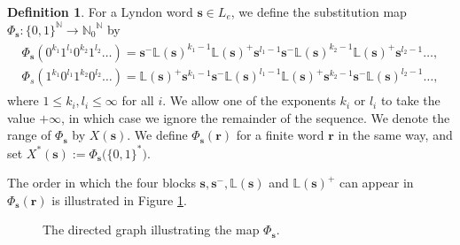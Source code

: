 \documentclass[11pt]{amsart}
\theoremstyle{definition}
\newtheorem{definition}[theorem]{Definition}
\theoremstyle{remark}
\numberwithin{equation}{section}
\newcommand{\N}{\ensuremath{\mathbb{N}}}
\renewcommand{\L}{\ensuremath{\mathbb{L}}}
\newcommand{\s}{ {\mathbf{s}}}
\renewcommand{\r}{ {\mathbf{r}}}
\newcommand{\f}{\infty}
\begin{document}
\begin{definition} \label{def:substitution}
For a Lyndon word $\s\in {L_e}$, we define the substitution map $\Phi_\s: \{0,1\}^\N\to {\N_0}^\N$ by
\begin{gather} \label{eq:block-map}
\begin{split}
\Phi_\s(0^{k_1}1^{l_1}0^{k_2}1^{l_2}\dots)=\s^-\L(\s)^{k_1-1}\L(\s)^+\s^{l_1-1}\s^-\L(\s)^{k_2-1}\L(\s)^+\s^{l_2-1}\dots,\\
\Phi_s(1^{k_1}0^{l_1}1^{k_2}0^{l_2}\dots)=\L(\s)^+\s^{k_1-1}\s^-\L(\s)^{l_1-1}\L(\s)^+\s^{k_2-1}\s^-\L(\s)^{l_2-1}\dots,
\end{split}
\end{gather}
where $1\leq k_i, l_i\leq \f$ for all $i$.
We allow one of the exponents $k_i$ or $l_i$ to take the value $+\f$, in which case we ignore the remainder of the sequence. We denote the range of $\Phi_\s$ by $X(\s)$.
We define $\Phi_\s(\r)$ for a finite word $\r$ in the same way, and set $X^*(\s):=\Phi_\s\big(\{0,1\}^*\big)$.
\end{definition}

The order in which the four blocks $\s,\s^-,\L(\s)$ and $\L(\s)^+$ can appear in $\Phi_\s(\r)$ is illustrated in Figure \ref{fig:directed-graph}.

   \begin{figure}[h!]
  \centering
\caption{The directed graph illustrating the map $\Phi_\s$.}
\label{fig:directed-graph}
\end{figure}
\end{document}
